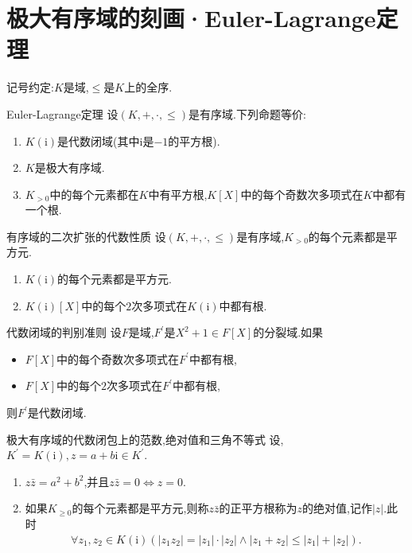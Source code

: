 \section{极大有序域的刻画·Euler-Lagrange定理}

记号约定:$K$是域,$\leqslant$是$K$上的全序.

\begin{theorem}{Euler-Lagrange定理}{}
	设$\left(K,+,\cdot,\leq\right)$是有序域.下列命题等价:
	\begin{enumerate}
		\item $K(\mathrm{i})$是代数闭域(其中$\mathrm{i}$是$-1$的平方根).
		\item $K$是极大有序域.
		\item $K_{>0}$中的每个元素都在$K$中有平方根,$K[X]$中的每个奇数次多项式在$K$中都有一个根.
	\end{enumerate}
\end{theorem}

\begin{corollary}{有序域的二次扩张的代数性质}{}
	设$\left(K,+,\cdot,\leq\right)$是有序域,$K_{>0}$的每个元素都是平方元.
	\begin{enumerate}
		\item $K\left(\mathrm{i}\right)$的每个元素都是平方元.
		\item $K(\mathrm{i})[X]$中的每个$2$次多项式在$K(\mathrm{i})$中都有根.
	\end{enumerate}
\end{corollary}

\begin{proposition}{代数闭域的判别准则}{}
	设$F$是域,$F^{\prime}$是$X^{2}+1\in F\left[X\right]$的分裂域.如果
	\begin{itemize}
		\item $F[X]$中的每个奇数次多项式在$F^{\prime}$中都有根,
		\item $F[X]$中的每个$2$次多项式在$F^{\prime}$中都有根,
	\end{itemize}
	则$F^{\prime}$是代数闭域.
\end{proposition}

\begin{remark}{极大有序域的代数闭包上的范数,绝对值和三角不等式}{}
	设,$K^{\prime}=K(\mathrm{i}),z=a+b\mathrm{i}\in K^{\prime}$.
	\begin{enumerate}
		\item $z\bar{z}=a^{2}+b^{2}$,并且$z\bar{z}=0\iff z=0$.
		\item 如果$K_{\geq 0}$的每个元素都是平方元,则称$z\bar{z}$的正平方根称为$z$的绝对值,记作$\left|z\right|$.此时
		\begin{align*}
			\forall z_{1},z_{2}\in K\left(\mathrm{i}\right)\left(\left|z_{1}z_{2}\right|=\left|z_{1}\right|\cdot\left|z_{2}\right|\wedge \left|z_{1}+z_{2}\right|\leqslant\left|z_{1}\right|+\left|z_{2}\right|\right).
		\end{align*}
	\end{enumerate}
\end{remark}

